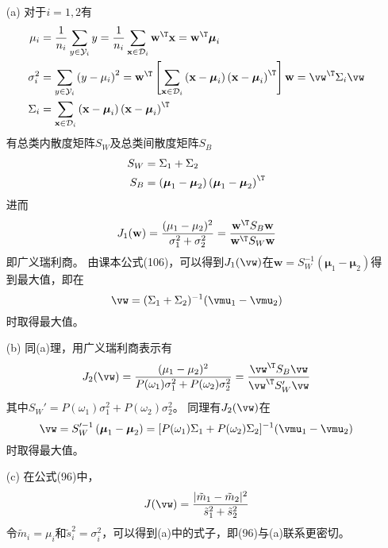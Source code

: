 \documentclass[reportComp]{thesis}
\begin{document}
\begin{answer}
\begin{itemize}
	\item [(a)] 对于$i=1,2$有
	\[\begin{aligned}
	\mu_{i} &=\frac{1}{n_{i}} \sum_{y \in \mathcal{Y}_{i}} y=\frac{1}{n_{i}} \sum_{\mathbf{x} \in \mathcal{D}_{i}} \mathbf{w}^{\T} \mathbf{x}=\mathbf{w}^{\T} \boldsymbol{\mu}_{i} \\
	\sigma_{i}^{2} &=\sum_{y \in \mathcal{Y}_{i}}\left(y-\mu_{i}\right)^{2}=\mathbf{w}^{\T}\left[\sum_{\mathbf{x} \in \mathcal{D}_{i}}\left(\mathbf{x}-\boldsymbol{\mu}_{i}\right)\left(\mathbf{x}-\boldsymbol{\mu}_{i}\right)^{\T}\right] \mathbf{w}=\vw^\T\Sigma_i\vw \\
	\Sigma_{i} &=\sum_{\mathbf{x} \in \mathcal{D}_{i}}\left(\mathbf{x}-\boldsymbol{\mu}_{i}\right)\left(\mathbf{x}-\boldsymbol{\mu}_{i}\right)^{\T}
	\end{aligned}\]
	有总类内散度矩阵$S_W$及总类间散度矩阵$S_B$
	\[\begin{aligned}
	S_W &=\Sigma_{1}+\Sigma_{2} \\
	S_B &=\left(\boldsymbol{\mu}_{1}-\boldsymbol{\mu}_{2}\right)\left(\boldsymbol{\mu}_{1}-\boldsymbol{\mu}_{2}\right)^{\T}
	\end{aligned}\]
	进而
	\[J_{1}(\mathbf{w})=\frac{(\mu_1-\mu_2)^2}{\sigma_1^2+\sigma_2^2}=\frac{\mathbf{w}^{\T} S_B \mathbf{w}}{\mathbf{w}^{\T} S_W \mathbf{w}}\]
	即广义瑞利商。
	由课本公式(106)，可以得到$J_1(\vw)$在$\mathbf{w}= S_W^{-1}\left(\boldsymbol{\mu}_{1}-\boldsymbol{\mu}_{2}\right)$得到最大值，即在
	\[\vw=(\Sigma_1+\Sigma_2)^{-1}(\vmu_1-\vmu_2)\]
	时取得最大值。
	\item [(b)] 同(a)理，用广义瑞利商表示有
	\[J_2(\vw)=\frac{(\mu_1-\mu_2)^2}{P(\omega_1)\sigma_1^2+P(\omega_2)\sigma_2^2}=
	\frac{\vw^\T S_B\vw}{\vw^\T S_W' \vw}\]
	其中$S_W'=P(\omega_1)\sigma_1^2+P(\omega_2)\sigma_2^2$。
	同理有$J_2(\vw)$在
	\[\vw=S_W'^{-1}\left(\boldsymbol{\mu}_{1}-\boldsymbol{\mu}_{2}\right)=
	[P(\omega_1)\Sigma_1+P(\omega_2)\Sigma_2]^{-1}(\vmu_1-\vmu_2)\]
	时取得最大值。
	\item [(c)] 在公式(96)中，
	\[J(\vw)=\frac{|\tilde{m}_1-\tilde{m}_2|^2}{\tilde{s}_1^2+\tilde{s}_2^2}\]
	令$\tilde{m}_i=\mu_i$和$\tilde{s}_i^2=\sigma_i^2$，可以得到(a)中的式子，即(96)与(a)联系更密切。
\end{itemize}
\end{answer}
\end{document}
